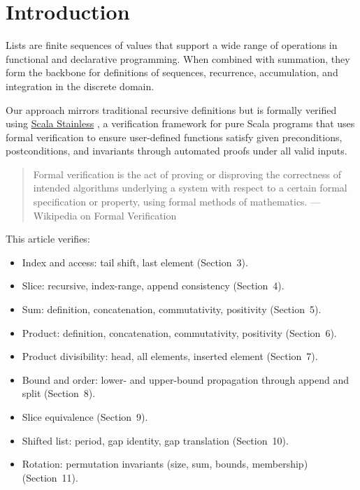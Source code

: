 \section{Introduction}
\label{sec:introduction}

Lists are finite sequences of values that support a wide range of
operations in functional and declarative programming. When combined with
summation, they form the backbone for definitions of sequences,
recurrence, accumulation, and integration in the discrete domain.

Our approach mirrors traditional recursive definitions but is formally
verified using
\href{https://epfl-lara.github.io/stainless/intro.html}{Scala Stainless}
\cite{hamza2019systemfr}, a verification framework for pure Scala programs
that uses formal verification to ensure user-defined functions satisfy
given preconditions, postconditions, and invariants through automated
proofs under all valid inputs.

\begin{quote}
Formal verification is the act of proving or disproving the correctness of
intended algorithms underlying a system with respect to a certain formal
specification or property, using formal methods of mathematics.
--- Wikipedia on Formal Verification \cite{wikipedia2026formalverification}
\end{quote}

This article verifies:

\begin{itemize}
  \item Index and access: tail shift, last element (Section~3).
  \item Slice: recursive, index-range, append consistency (Section~4).
  \item Sum: definition, concatenation, commutativity, positivity
    (Section~5).
  \item Product: definition, concatenation, commutativity, positivity
    (Section~6).
  \item Product divisibility: head, all elements, inserted element
    (Section~7).
  \item Bound and order: lower- and upper-bound propagation through append
    and split (Section~8).
  \item Slice equivalence (Section~9).
  \item Shifted list: period, gap identity, gap translation
    (Section~10).
  \item Rotation: permutation invariants (size, sum, bounds, membership)
    (Section~11).
\end{itemize}

